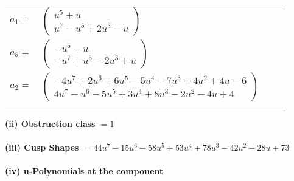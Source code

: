 \documentclass[1p]{elsarticle_modified}
\theoremstyle{definition}
\begin{document}
\begin{tabular}{m{7pt} m{180pt} m{7pt} m{180pt} }
\flushright $a_{1}=$&$\begin{pmatrix}u^5+u\\u^7- u^5+2 u^3- u\end{pmatrix}$ \\
\flushright $a_{5}=$&$\begin{pmatrix}- u^5- u\\- u^7+u^5-2 u^3+u\end{pmatrix}$ \\
\flushright $a_{2}=$&$\begin{pmatrix}-4 u^7+2 u^6+6 u^5-5 u^4-7 u^3+4 u^2+4 u-6\\4 u^7- u^6-5 u^5+3 u^4+8 u^3-2 u^2-4 u+4\end{pmatrix}$\\&\end{tabular}
\flushleft \textbf{(ii) Obstruction class $= 1$}\\~\\
\flushleft \textbf{(iii) Cusp Shapes $= 44 u^7-15 u^6-58 u^5+53 u^4+78 u^3-42 u^2-28 u+73$}\\~\\
\newpage\renewcommand{\arraystretch}{1}
\flushleft \textbf{(iv) u-Polynomials at the component}\newline \\
\end{document}
